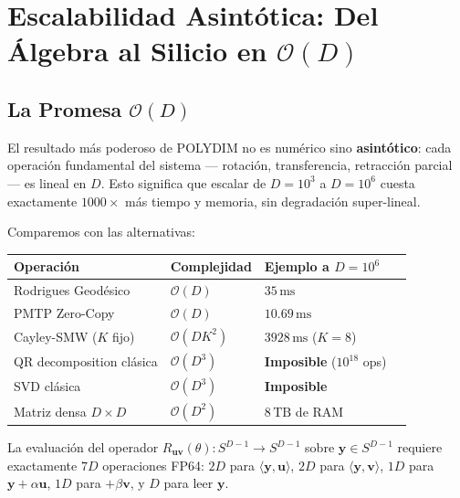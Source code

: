 \chapter{Escalabilidad Asintótica: Del Álgebra al Silicio en $\mathcal{O}(D)$}


\section{La Promesa $\mathcal{O}(D)$}

El resultado más poderoso de POLYDIM no es numérico sino \textbf{asintótico}: cada
operación fundamental del sistema --- rotación, transferencia, retracción parcial ---
es lineal en $D$. Esto significa que escalar de $D = 10^3$ a $D = 10^6$ cuesta
exactamente $1000\times$ más tiempo y memoria, sin degradación super-lineal.

Comparemos con las alternativas:

\begin{tabular}{llll}
\hline
\textbf{Operación} & \textbf{Complejidad} & \textbf{Ejemplo a $D=10^6$} \\
\hline
Rodrigues Geodésico & $\mathcal{O}(D)$ & $35\,\text{ms}$ \\
PMTP Zero-Copy & $\mathcal{O}(D)$ & $10.69\,\text{ms}$ \\
Cayley-SMW ($K$ fijo) & $\mathcal{O}(DK^2)$ & $3928\,\text{ms}$ ($K=8$) \\
QR decomposition clásica & $\mathcal{O}(D^3)$ & \textbf{Imposible} ($10^{18}$ ops) \\
SVD clásica & $\mathcal{O}(D^3)$ & \textbf{Imposible} \\
Matriz densa $D\times D$ & $\mathcal{O}(D^2)$ & $8\,\text{TB}$ de RAM \\
\hline


\end{tabular}

\begin{theorem}
La evaluación del operador $R_{\mathbf{u}\mathbf{v}}(\theta) : S^{D-1} \to S^{D-1}$
sobre $\mathbf{y} \in S^{D-1}$ requiere exactamente $7D$ operaciones FP64:
$2D$ para $\langle\mathbf{y},\mathbf{u}\rangle$, $2D$ para $\langle\mathbf{y},\mathbf{v}\rangle$,
$1D$ para $\mathbf{y} + \alpha\mathbf{u}$, $1D$ para $+\beta\mathbf{v}$, y $D$ para leer $\mathbf{y}$.
\end{theorem}

